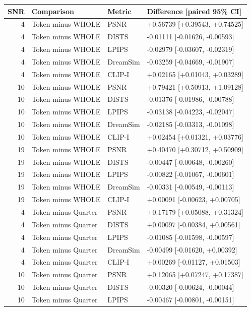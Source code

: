 \documentclass[10pt,letterpaper]{article}
\begin{document}
\begin{longtable}{@{}rlll@{}}\toprule
SNR & Comparison & Metric & Difference [paired 95\% CI]\\\midrule\endhead
4 & Token minus WHOLE & PSNR & +0.56739 [+0.39543, +0.74525]\\
4 & Token minus WHOLE & DISTS & -0.01111 [-0.01626, -0.00593]\\
4 & Token minus WHOLE & LPIPS & -0.02979 [-0.03607, -0.02319]\\
4 & Token minus WHOLE & DreamSim & -0.03259 [-0.04669, -0.01907]\\
4 & Token minus WHOLE & CLIP-I & +0.02165 [+0.01043, +0.03289]\\
10 & Token minus WHOLE & PSNR & +0.79421 [+0.50913, +1.09128]\\
10 & Token minus WHOLE & DISTS & -0.01376 [-0.01986, -0.00788]\\
10 & Token minus WHOLE & LPIPS & -0.03138 [-0.04223, -0.02047]\\
10 & Token minus WHOLE & DreamSim & -0.02185 [-0.03313, -0.01098]\\
10 & Token minus WHOLE & CLIP-I & +0.02454 [+0.01321, +0.03776]\\
19 & Token minus WHOLE & PSNR & +0.40470 [+0.30712, +0.50909]\\
19 & Token minus WHOLE & DISTS & -0.00447 [-0.00648, -0.00260]\\
19 & Token minus WHOLE & LPIPS & -0.00822 [-0.01067, -0.00601]\\
19 & Token minus WHOLE & DreamSim & -0.00331 [-0.00549, -0.00113]\\
19 & Token minus WHOLE & CLIP-I & +0.00091 [-0.00623, +0.00705]\\
4 & Token minus Quarter & PSNR & +0.17179 [+0.05088, +0.31324]\\
4 & Token minus Quarter & DISTS & +0.00097 [-0.00384, +0.00561]\\
4 & Token minus Quarter & LPIPS & -0.01085 [-0.01598, -0.00597]\\
4 & Token minus Quarter & DreamSim & -0.00499 [-0.01620, +0.00392]\\
4 & Token minus Quarter & CLIP-I & +0.00269 [-0.01127, +0.01503]\\
10 & Token minus Quarter & PSNR & +0.12065 [+0.07247, +0.17387]\\
10 & Token minus Quarter & DISTS & -0.00320 [-0.00624, -0.00044]\\
10 & Token minus Quarter & LPIPS & -0.00467 [-0.00801, -0.00151]\\

\end{longtable}
\end{document}
